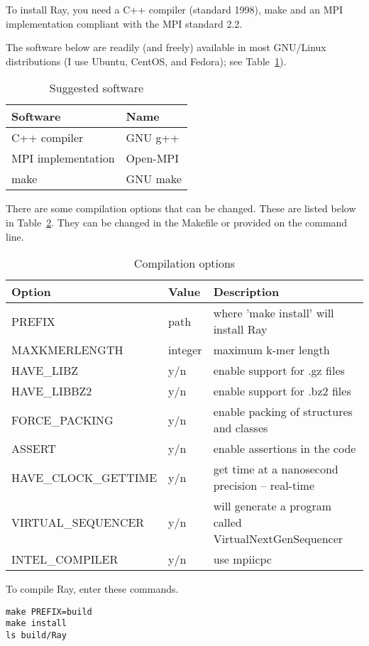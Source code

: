 \documentclass{article}
\begin{document}
To install Ray, you need a C++ compiler (standard 1998), make and an MPI implementation compliant
with the MPI standard 2.2.

The software below are readily (and freely) available in most GNU/Linux distributions (I use Ubuntu, CentOS, and Fedora); 
see Table~\ref{software}).


\begin{table}[h]
\caption{Suggested software}\label{software}
\begin{tabular}{ll}
\hline
Software & Name \\
\hline
C++ compiler & GNU g++ \\
MPI implementation & Open-MPI \\
make & GNU make \\
\hline
\end{tabular}
\end{table}

There are some compilation options that can be changed. These are listed below in Table~\ref{flags}.
They can be changed in the Makefile or provided on the command line.

\begin{table}[h]
\caption{Compilation options}\label{flags}
\begin{tabular}{lll}
\hline
Option & Value & Description \\
\hline
PREFIX & path & where 'make install' will install Ray \\
MAXKMERLENGTH & integer & maximum k-mer length \\
HAVE\_LIBZ & y/n & enable support for .gz files \\
HAVE\_LIBBZ2 & y/n& enable support for .bz2 files \\
FORCE\_PACKING & y/n& enable packing of structures and classes\\
ASSERT & y/n& enable assertions in the code \\
HAVE\_CLOCK\_GETTIME & y/n& get time at a nanosecond precision -- real-time \\
VIRTUAL\_SEQUENCER & y/n& will generate a program called VirtualNextGenSequencer \\
INTEL\_COMPILER & y/n& use mpiicpc \\
\hline
\end{tabular}
\end{table}

To compile Ray, enter these commands.

\begin{verbatim}
make PREFIX=build
make install
ls build/Ray
\end{verbatim}
\end{document}

